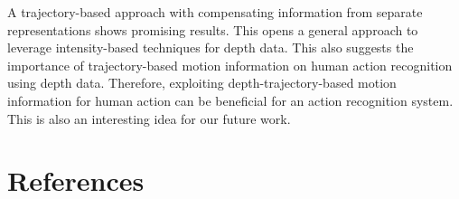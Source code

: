 \documentclass[review]{elsarticle}
\begin{document}
A trajectory-based approach with compensating information from separate representations shows promising results. This opens a general approach to leverage intensity-based techniques for depth data. This also suggests the importance of trajectory-based motion information on human action recognition using depth data. Therefore, exploiting depth-trajectory-based motion information for human action can be beneficial for an action recognition system. This is also an interesting idea for our future work.

\section*{References}



\end{document}
